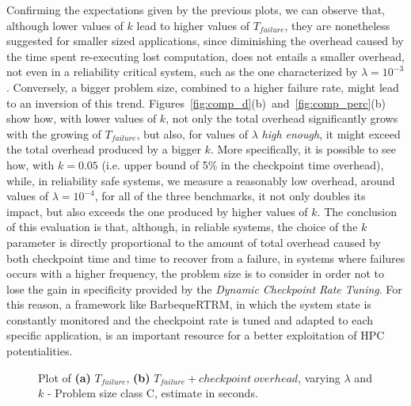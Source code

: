 Confirming the expectations given by the previous plots, we can observe that, although lower values of $k$ lead to higher values of $T_{failure}$, they are nonetheless suggested for smaller sized applications, since diminishing the overhead caused by the time spent re-executing lost computation, does not entails a smaller overhead, not even in a reliability critical system, such as the one characterized by $\lambda=10^{-3}$. Conversely, a bigger problem size, combined to a higher failure rate, might lead to an inversion of this trend. Figures~\ref{fig:comp_d}(b)~and~\ref{fig:comp_perc}(b) show how, with lower values of $k$, not only the total overhead significantly grows with the growing of $T_{failure}$, but also, for values of $\lambda$ \emph{high enough}, it might exceed the total overhead produced by a bigger $k$. More specifically, it is possible to see how, with $k=0.05$ (i.e. upper bound of 5\% in the checkpoint time overhead), while, in reliability safe systems, we measure a reasonably low overhead, around values of $\lambda=10^{-4}$, for all of the three benchmarks, it not only doubles its impact, but also exceeds the one produced by higher values of $k$. The conclusion of this evaluation is that, although, in reliable systems, the choice of the $k$ parameter is directly proportional to the amount of total overhead caused by both checkpoint time and time to recover from a failure, in systems where failures occurs with a higher frequency, the problem size is to consider in order not to lose the gain in specificity provided by the \emph{Dynamic Checkpoint Rate Tuning}. For this reason, a framework like BarbequeRTRM, in which the system state is constantly monitored and the checkpoint rate is tuned and adapted to each specific application, is an important resource for a better exploitation of HPC potentialities.

{\captionsetup[subfloat]{labelformat=empty}
\begin{figure}
    \centering
    {
    \vspace{-1.1em}}
    {
    \vspace{-1.1em}}
    {
    }
    \caption{Plot of \textbf{(a)} $T_{failure}$, \textbf{(b)} $T_{failure}+checkpoint\ overhead$, varying $\lambda$ and $k$ - Problem size class C, estimate in seconds.}%
    \label{fig:comp_c}%
\end{figure}}

